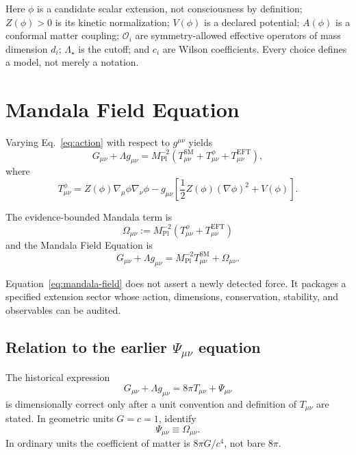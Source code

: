 \documentclass[11pt]{article}
\newcommand{\Mpl}{M_{\mathrm{Pl}}}
\newcommand{\Tsm}{T^{\mathrm{SM}}_{\mu\nu}}
\newcommand{\Tphi}{T^{\phi}_{\mu\nu}}
\newcommand{\Teft}{T^{\mathrm{EFT}}_{\mu\nu}}
\newcommand{\Om}{\Omega_{\mu\nu}}
\begin{document}
Here $\phi$ is a candidate scalar extension, not consciousness by definition; $Z(\phi)>0$ is its kinetic normalization; $V(\phi)$ is a declared potential; $A(\phi)$ is a conformal matter coupling; $\mathcal O_i$ are symmetry-allowed effective operators of mass dimension $d_i$; $\Lambda_\star$ is the cutoff; and $c_i$ are Wilson coefficients. Every choice defines a model, not merely a notation.

\section{Mandala Field Equation}

Varying Eq.~\eqref{eq:action} with respect to $g^{\mu\nu}$ yields
\begin{equation}
G_{\mu\nu}+\Lambda g_{\mu\nu}
=\Mpl^{-2}\left(\Tsm+\Tphi+\Teft\right),
\label{eq:einstein-full}
\end{equation}
where
\begin{equation}
T^{\phi}_{\mu\nu}
=Z(\phi)\nabla_\mu\phi\nabla_\nu\phi
-g_{\mu\nu}\left[\frac12Z(\phi)(\nabla\phi)^2+V(\phi)\right].
\label{eq:tphi}
\end{equation}

The evidence-bounded Mandala term is
\begin{equation}
\boxed{
\Om:=\Mpl^{-2}\left(\Tphi+\Teft\right)
}
\label{eq:omega-definition}
\end{equation}
and the Mandala Field Equation is
\begin{equation}
\boxed{
G_{\mu\nu}+\Lambda g_{\mu\nu}
=\Mpl^{-2}\Tsm+\Om.
}
\label{eq:mandala-field}
\end{equation}

Equation~\eqref{eq:mandala-field} does not assert a newly detected force. It packages a specified extension sector whose action, dimensions, conservation, stability, and observables can be audited.

\subsection{Relation to the earlier \texorpdfstring{$\Psi_{\mu\nu}$}{Psi(mu,nu)} equation}

The historical expression
\begin{equation}
G_{\mu\nu}+\Lambda g_{\mu\nu}
=8\pi T_{\mu\nu}+\Psi_{\mu\nu}
\label{eq:legacy-psi}
\end{equation}
is dimensionally correct only after a unit convention and definition of $T_{\mu\nu}$ are stated. In geometric units $G=c=1$, identify
\begin{equation}
\Psi_{\mu\nu}\equiv\Omega_{\mu\nu}.
\end{equation}
In ordinary units the coefficient of matter is $8\pi G/c^4$, not bare $8\pi$.
\end{document}
